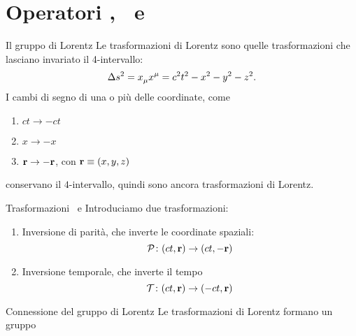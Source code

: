 \section{Operatori \hP, \hT\ e \hPT}
\begin{frame}{Il gruppo di Lorentz}
    Le trasformazioni di Lorentz sono quelle trasformazioni che lasciano invariato il 4-intervallo:
    \begin{equation*}
        \Delta s^2 = \tensor{x}{_\mu}\tensor{x}{^\mu} = c^2t^2 - x^2 - y^2 - z^2
        \myperiod
    \end{equation*}
    \pause
    I cambi di segno di una o più delle coordinate, come
    \begin{enumerate}[label=\mybullet]
        \item $ct \to -ct$
        \item $x \to -x$
        \item $\vb{r} \to -\vb{r}$, con $\vb{r} \equiv \pqty{x,y,z}$
    \end{enumerate}
    conservano il $4$-intervallo, quindi sono ancora trasformazioni di Lorentz.
\end{frame}

\begin{frame}{Trasformazioni \mcP\ e \mcT}
    Introduciamo due trasformazioni:
    \begin{enumerate}[label=\mybullet]
        \pause
        \item Inversione di parità, che inverte le coordinate spaziali:
            \begin{equation*}
                \func{\mcP}{\pqty{ct,\vb{r}}}{\pqty{ct,-\vb{r}}}
            \end{equation*}
        \pause
        \item Inversione temporale, che inverte il tempo
            \begin{equation*}
                \func{\mcT}{\pqty{ct,\vb{r}}}{\pqty{-ct,\vb{r}}}
            \end{equation*}
    \end{enumerate}
\end{frame}

\begin{frame}{Connessione del gruppo di Lorentz}
    Le trasformazioni di Lorentz formano un gruppo
    
\end{frame}